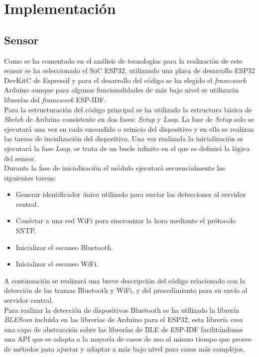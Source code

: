\documentclass[../proyecto.tex]{subfiles}
\begin{document}
\chapter{Implementación}

\section{Sensor}

Como se ha comentado en el análisis de tecnologías para la realización de este sensor se ha seleccionado el SoC ESP32, utilizando una placa de desarrollo ESP32 DevKitC de Espressif y para el desarrollo del código se ha elegido el \textit{framework} Arduino aunque para algunas funcionalidades de más bajo nivel se utilizarán librerías del \textit{framework} ESP-IDF.\\

Para la estructuración del código principal se ha utilizado la estructura básica de \textit{Sketch} de Arduino consistente en dos fases: \textit{Setup} y \textit{Loop}. La fase de \textit{Setup} solo se ejecutará una vez en cada encendido o reinicio del dispositivo y en ella se realizan las tareas de incialización del dispositivo. Una vez realizada la inicialización se ejecutará la fase \textit{Loop}, se trata de un bucle infinito en el que se definirá la lógica del sensor.\\

Durante la fase de inicialización el módulo ejecutará secuencialmente las siguientes tareas:
\begin{itemize}
  \item Generar identificador único utilizado para enviar las detecciones al servidor central.
  \item Conéctar a una red WiFi para sincronizar la hora mediante el prótocolo SNTP.
  \item Inicializar el escaneo Bluetooth.
  \item Inicializar el escaneo WiFi.
\end{itemize}

A continuación se realizará una breve descripción del código relacionado con la detección de las tramas Bluetooth y WiFi, y del procedimiento para su envío al servidor central.\\

Para realizar la detección de dispositivos Bluetooth se ha utilizado la librería \textit{BLEScan} incluida en las librerías de Arduino para el ESP32, esta librería crea una capa de abstracción sobre las librerías de BLE de ESP-IDF facilitándonos una API que se adapta a la mayoría de casos de uso al mismo tiempo que provee de métodos para ajustar y adaptar a más bajo nivel para casos más complejos.\\
\end{document}
